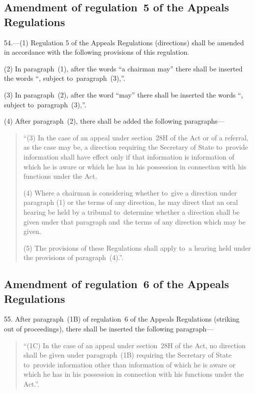 \documentclass[12pt,a4paper]{article}
\begin{document}
\subsection[54. Amendment of regulation~5 of the Appeals Regulations]{Amendment of regulation~5 of the Appeals Regulations}

54.—(1) Regulation 5 of the
Appeals Regulations (directions) shall be amended in accordance with the
following provisions of this regulation.

(2) In paragraph~(1), after the words “a chairman may” there shall be inserted
the words “, subject to~paragraph~(3),”.

(3) In paragraph~(2), after the word “may” there shall be inserted the words “,
subject to~paragraph~(3),”.

(4) After paragraph~(2), there shall be added the following paragraphs—
\begin{quotation}
“(3) In the case of an appeal under section~28H of the Act or of a referral, as
the case may be, a direction requiring the Secretary of State to~provide
information shall have effect only if that information is information of which
he is aware or which he has in his possession in connection with his functions
under the Act.

(4) Where a chairman is considering whether to~give a direction under paragraph
(1) or the terms of any direction, he may direct that an oral hearing be held by
a tribunal to~determine whether a direction shall be given under that paragraph
and~the terms of any direction which may be given.

(5) The provisions of these Regulations shall apply to~a hearing held under the
provisions of paragraph~(4).”.
\end{quotation}

\subsection[55. Amendment of regulation~6 of the Appeals Regulations]{Amendment of regulation~6 of the Appeals Regulations}

55. After paragraph~(1B) of
regulation~6 of the Appeals Regulations (striking out of proceedings), there
shall be inserted the following paragraph—
\begin{quotation}
“(1C) In the case of an appeal under section~28H of the Act, no direction shall
be given under paragraph~(1B) requiring the Secretary of State to~provide
information other than information of which he is aware or which he has in his
possession in connection with his functions under the Act.”.
\end{quotation}
\end{document}
